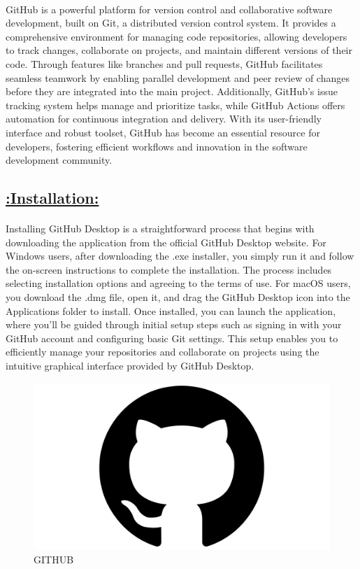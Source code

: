 \documentclass[a4paper,12pt]{article}
\begin{document}
\paragraph{}
GitHub is a powerful platform for version control and collaborative software development, built on Git, a distributed version control system. It provides a comprehensive environment for managing code repositories, allowing developers to track changes, collaborate on projects, and maintain different versions of their code. Through features like branches and pull requests, GitHub facilitates seamless teamwork by enabling parallel development and peer review of changes before they are integrated into the main project. Additionally, GitHub's issue tracking system helps manage and prioritize tasks, while GitHub Actions offers automation for continuous integration and delivery. With its user-friendly interface and robust toolset, GitHub has become an essential resource for developers, fostering efficient workflows and innovation in the software development community.


\begin{center}
\section*{\uline{:Installation:}}
\end{center}

\paragraph{}
Installing GitHub Desktop is a straightforward process that begins with downloading the application from the official GitHub Desktop website. For Windows users, after downloading the .exe installer, you simply run it and follow the on-screen instructions to complete the installation. The process includes selecting installation options and agreeing to the terms of use. For macOS users, you download the .dmg file, open it, and drag the GitHub Desktop icon into the Applications folder to install. Once installed, you can launch the application, where you'll be guided through initial setup steps such as signing in with your GitHub account and configuring basic Git settings. This setup enables you to efficiently manage your repositories and collaborate on projects using the intuitive graphical interface provided by GitHub Desktop.

\begin{figure}[h!]
    \centering
    \includegraphics[width=0.5\linewidth]{GitHub-Symbol.png}
    \caption{GITHUB}
    
\end{figure}
\end{document}
